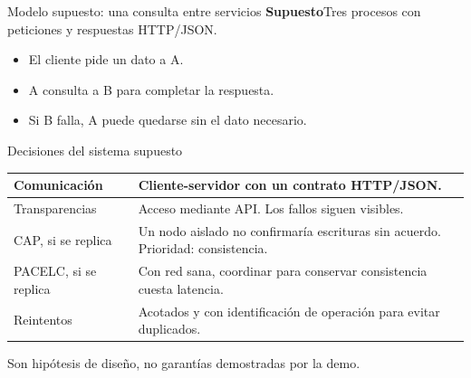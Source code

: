\begin{frame}{Modelo supuesto: una consulta entre servicios}\relax
\small
\textbf{Supuesto}\quad Tres procesos con peticiones y respuestas HTTP/JSON.
\par\bigskip
\begin{center}

\end{center}
\medskip
\begin{itemize}
  \item El cliente pide un dato a A.
  \item A consulta a B para completar la respuesta.
  \item Si B falla, A puede quedarse sin el dato necesario.
\end{itemize}
\end{frame}

\begin{frame}{Decisiones del sistema supuesto}\relax
\small
\renewcommand{\arraystretch}{1.1}
\begin{tabularx}{\linewidth}{|l|X|}
\hline
Comunicación & Cliente-servidor con un contrato HTTP/JSON.\\\hline
Transparencias & Acceso mediante API. Los fallos siguen visibles.\\\hline
CAP, si se replica & Un nodo aislado no confirmaría escrituras sin acuerdo. Prioridad: consistencia.\\\hline
PACELC, si se replica & Con red sana, coordinar para conservar consistencia cuesta latencia.\\\hline
Reintentos & Acotados y con identificación de operación para evitar duplicados.\\\hline
\end{tabularx}
\medskip
{\footnotesize Son hipótesis de diseño, no garantías demostradas por la demo. \cite{ahmed2023consistency,azureRetry2026}}
\end{frame}

